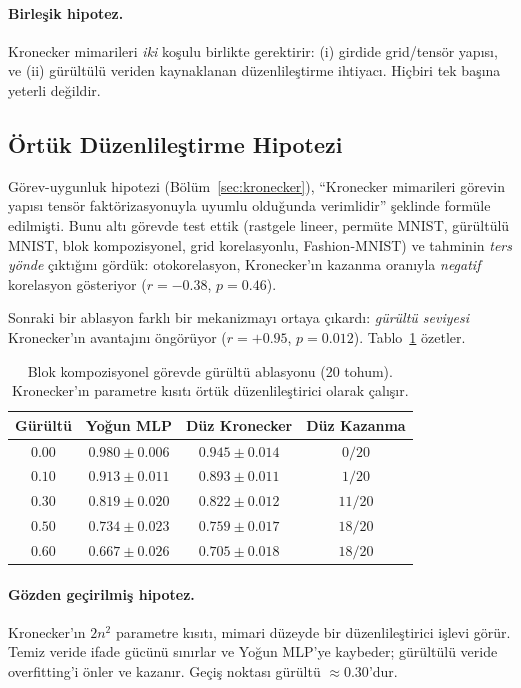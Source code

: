 \documentclass[11pt,a4paper]{article}
\begin{document}
\paragraph{Birleşik hipotez.}
Kronecker mimarileri \emph{iki} koşulu birlikte gerektirir:
(i) girdide grid/tensör yapısı, ve (ii) gürültülü veriden kaynaklanan
düzenlileştirme ihtiyacı. Hiçbiri tek başına yeterli değildir.

\subsection{Örtük Düzenlileştirme Hipotezi}
\label{sec:regularization}

Görev-uygunluk hipotezi (Bölüm~\ref{sec:kronecker}), ``Kronecker
mimarileri görevin yapısı tensör faktörizasyonuyla uyumlu olduğunda
verimlidir'' şeklinde formüle edilmişti. Bunu altı görevde test ettik
(rastgele lineer, permüte MNIST, gürültülü MNIST, blok kompozisyonel,
grid korelasyonlu, Fashion-MNIST) ve tahminin \emph{ters yönde}
çıktığını gördük: otokorelasyon, Kronecker'ın kazanma oranıyla
\emph{negatif} korelasyon gösteriyor ($r = -0.38$, $p = 0.46$).

Sonraki bir ablasyon farklı bir mekanizmayı ortaya çıkardı:
\emph{gürültü seviyesi} Kronecker'ın avantajını öngörüyor
($r = +0.95$, $p = 0.012$). Tablo~\ref{tab:noise-ablation} özetler.

\begin{table}[h]
\centering
\caption{Blok kompozisyonel görevde gürültü ablasyonu (20 tohum).
Kronecker'ın parametre kısıtı örtük düzenlileştirici olarak çalışır.}
\label{tab:noise-ablation}
\small
\begin{tabular}{cccc}
\toprule
Gürültü & Yoğun MLP & Düz Kronecker & Düz Kazanma \\
\midrule
$0.00$ & $0.980 \pm 0.006$ & $0.945 \pm 0.014$ & $0/20$ \\
$0.10$ & $0.913 \pm 0.011$ & $0.893 \pm 0.011$ & $1/20$ \\
$0.30$ & $0.819 \pm 0.020$ & $0.822 \pm 0.012$ & $11/20$ \\
$0.50$ & $0.734 \pm 0.023$ & $0.759 \pm 0.017$ & $18/20$ \\
$0.60$ & $0.667 \pm 0.026$ & $0.705 \pm 0.018$ & $18/20$ \\
\bottomrule
\end{tabular}
\end{table}

\paragraph{Gözden geçirilmiş hipotez.}
Kronecker'ın $2n^2$ parametre kısıtı, mimari düzeyde bir
düzenlileştirici işlevi görür. Temiz veride ifade gücünü sınırlar
ve Yoğun MLP'ye kaybeder; gürültülü veride overfitting'i önler ve
kazanır. Geçiş noktası gürültü $\approx 0.30$'dur.
\end{document}
